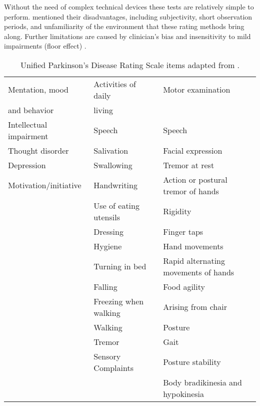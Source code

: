 Without the need of complex technical devices these tests are relatively simple to perform. \citeauthor{klerk_long-term_2009} \cite{klerk_long-term_2009} mentioned their disadvantages, including subjectivity, short observation periods, and unfamiliarity of the environment that these rating methods bring along. Further limitations are caused by clinician's bias and insensitivity to mild impairments (floor effect) \cite{mancini_isway:_2012}.

\begin{table}[h]
\begin{tabular}{lll}
\hline
Mentation, mood & Activities of daily & Motor examination \\
and behavior & living & \\
\hline
Intellectual impairment & Speech & Speech \\

Thought disorder & Salivation & Facial expression\\

Depression & Swallowing & Tremor at rest \\

Motivation/initiative & Handwriting & Action or postural tremor of hands \\

& Use of eating utensils & Rigidity \\

& Dressing & Finger taps\\

& Hygiene & Hand movements\\

& Turning in bed & Rapid alternating movements of hands\\

& Falling & Food agility\\

& Freezing when walking & Arising from chair \\

& Walking & Posture\\

& Tremor & Gait\\

& Sensory Complaints & Posture stability\\

& & Body bradikinesia and hypokinesia \\
\hline
\end{tabular}
\caption{Unified Parkinson's Disease Rating Scale items adapted from \cite{herndon_handbook_2006}.}
\label{tab:UPDRS}
\end{table}

